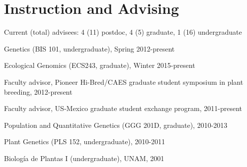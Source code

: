 \documentclass[letterpaper]{article}
\renewenvironment{itemize}{
  \begin{list}{}{
    \setlength{\leftmargin}{1.5em}
  }
}{
  \end{list}
}
\begin{document}
\section*{Instruction and Advising}
\begin{itemize}
\item Current (total) advisees: 4 (11) postdoc, 4 (5) graduate, 1 (16) undergraduate
\item Genetics (BIS 101, undergraduate), Spring 2012-present
\item Ecological Genomics (ECS243, graduate), Winter 2015-present
\item Faculty advisor, Pioneer Hi-Bred/CAES graduate student symposium in plant breeding, 2012-present
\item Faculty advisor, US-Mexico graduate student exchange program, 2011-present
\item Population and Quantitative Genetics (GGG 201D, graduate), 2010-2013 %
\item Plant Genetics (PLS 152, undergraduate), 2010-2011 %
\item Biolog\'{i}a de Plantas I (undergraduate), UNAM, 2001
\end{itemize}
\end{document}
